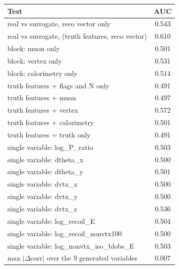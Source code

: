 \begin{tabular}{lc}
\toprule
Test & AUC \\
\midrule
real vs surrogate, reco vector only & 0.543 \\
real vs surrogate, (truth features, reco vector) & 0.610 \\
\midrule
block: muon only & 0.501 \\
block: vertex only & 0.531 \\
block: calorimetry only & 0.514 \\
truth features + flags and N only & 0.491 \\
truth features + muon & 0.497 \\
truth features + vertex & 0.572 \\
truth features + calorimetry & 0.501 \\
truth features + truth only & 0.491 \\
single variable: log\_P\_ratio & 0.503 \\
single variable: dtheta\_x & 0.500 \\
single variable: dtheta\_y & 0.501 \\
single variable: dvtx\_x & 0.500 \\
single variable: dvtx\_y & 0.500 \\
single variable: dvtx\_z & 0.536 \\
single variable: log\_recoil\_E & 0.504 \\
single variable: log\_recoil\_nonvtx100 & 0.500 \\
single variable: log\_nonvtx\_iso\_blobs\_E & 0.503 \\
\midrule
max $|\Delta$corr$|$ over the 9 generated variables & 0.007 \\
\bottomrule
\end{tabular}

